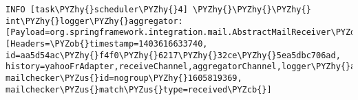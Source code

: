 \begin{Verbatim}[commandchars=\\\{\}]
INFO [task\PYZhy{}scheduler\PYZhy{}4] \PYZhy{}\PYZhy{}\PYZhy{} int\PYZhy{}logger\PYZhy{}aggregator: [Payload=org.springframework.integration.mail.AbstractMailReceiver\PYZdl{}IntegrationMimeMessage@563da1dc][Headers=\PYZob{}timestamp=1403616633740, id=aa5d54ac\PYZhy{}f4f0\PYZhy{}6217\PYZhy{}32ce\PYZhy{}5ea5dbc706ad, history=yahooFrAdapter,receiveChannel,aggregatorChannel,logger\PYZhy{}aggregator,logger\PYZhy{}aggregator.adapter, mailchecker\PYZus{}id=nogroup\PYZhy{}1605819369, mailchecker\PYZus{}match\PYZus{}type=received\PYZcb{}]
\end{Verbatim}
